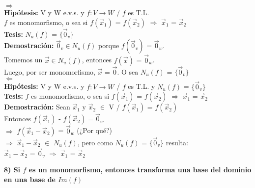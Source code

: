 \documentclass[11pt]{article}
\begin{document}
\vspace{2mm} \noindent
$\Longrightarrow$ \\
{\bfseries Hipótesis:} V y W e.v.s. y $f: V \rightarrow W$ / $f$ es T.L. \\ $f$ es monomorfismo, o sea si $f(\vec{x}_1)$ = $f(\vec{x}_2)$ $\Rightarrow$ $\vec{x}_1$ = $\vec{x}_2$ \\
{\bfseries Tesis:} $N_u(f)$ = $\{\vec{0}_v\}$ \\
{\bfseries Demostración:} $\vec{0}_v \in N_u(f)$ porque $f(\vec{0}_v)$ = $\vec{0}_w$. \\
Tomemos un $\vec{x} \in N_u(f)$, entonces $f(\vec{x})$ = $\vec{0}_w$. \\
Luego, por ser monomorfismo, $\vec{x}$ = $\vec{0}$. O sea $N_u(f)$ = $\{\vec{0}_v\}$ \\
$\Longleftarrow$ \\
{\bfseries Hipótesis:} V y W e.v.s. y $f: V \rightarrow W$ / $f$ es T.L. y $N_u(f)$ = $\{\vec{0}_v\}$  \\
{\bfseries Tesis:}  $f$ es monomorfismo, o sea si $f(\vec{x}_1)$ = $f(\vec{x}_2)$ $\Rightarrow$ $\vec{x}_1$ = $\vec{x}_2$\\
{\bfseries Demostración:} Sean $\vec{x}_1$ y $\vec{x}_2$ $\in$ V / $f(\vec{x}_1)$ = $f(\vec{x}_2)$\\
Entonces 
$f(\vec{x}_1)$ - $f(\vec{x}_2) = \vec{0}_w$  \\
$\Rightarrow$ $f(\vec{x}_1 - \vec{x}_2)$ = $\vec{0}_w$ (¿Por qué?) \\
$\Rightarrow$ $\vec{x}_1 - \vec{x}_2$ $\in$ $N_u(f)$, pero como $N_u(f)$ = $\{\vec{0}_v\}$  resulta: \\
$\vec{x}_1 - \vec{x}_2$ = $\vec{0}_v$ $\Rightarrow$ $\vec{x}_1$ = $\vec{x}_2$

\vspace{2mm} \noindent
{\Large \bfseries{8) Si $f$ es un monomorfismo, entonces transforma una base del dominio en una base de $Im(f)$}}
\end{document}
